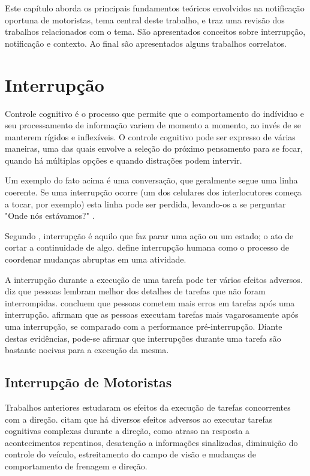 \label{revisao-lit}
Este capítulo aborda os principais fundamentos teóricos envolvidos na notificação oportuna de motoristas,
tema central deste trabalho, e traz uma revisão dos trabalhos relacionados com o tema. São apresentados
conceitos sobre interrupção, notificação e contexto. Ao final são apresentados alguns trabalhos correlatos.

\section{Interrupção}
\label{interrupcao}
Controle cognitivo é o processo que permite que o comportamento do indíviduo e seu processamento de informação variem de momento a
momento, ao invés de se manterem rígidos e inflexíveis. O controle cognitivo pode ser expresso de várias maneiras, uma das quais
envolve a seleção do próximo pensamento para se focar, quando há múltiplas opções e quando distrações podem intervir.

Um exemplo do fato acima é uma conversação, que geralmente segue uma linha coerente. Se uma interrupção ocorre (um dos celulares dos
interlocutores começa a tocar, por exemplo) esta linha pode ser perdida, levando-os a se perguntar "Onde nós estávamos?" \cite{altmann2014momentary}.

Segundo , interrupção é aquilo que faz parar uma ação ou um estado; o ato de cortar a continuidade de
algo.  define interrupção humana como o processo de coordenar mudanças abruptas em uma atividade.

A interrupção durante a execução de uma tarefa pode ter vários efeitos adversos.  diz
que pessoas lembram melhor dos detalhes de tarefas que não foram interrompidas.  concluem que
pessoas cometem mais erros em tarefas após uma interrupção.  afirmam que as pessoas executam tarefas
mais vagarosamente após uma interrupção, se comparado com a performance pré-interrupção. Diante destas evidências, pode-se
afirmar que interrupções durante uma tarefa são bastante nocivas para a execução da mesma.

\subsection{Interrupção de Motoristas}
\label{interrupcao-motoristas}

Trabalhos anteriores estudaram os efeitos da execução de tarefas concorrentes com a direção.  citam
que há diversos efeitos adversos ao executar tarefas cognitivas complexas durante a direção, como atraso na resposta a
acontecimentos repentinos, desatenção a informações sinalizadas, diminuição do controle do veículo, estreitamento do campo
de visão e mudanças de comportamento de frenagem e direção.

